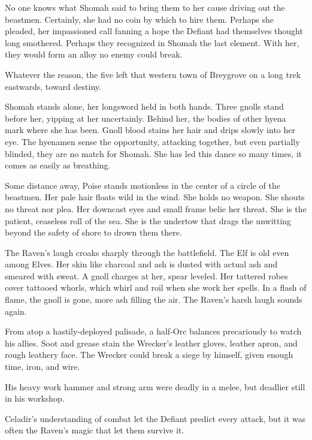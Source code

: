 No one knows what Shomah said to bring them to her cause driving out the beastmen.
Certainly, she had no coin by which to hire them.
Perhaps she pleaded, her impassioned call fanning a hope the Defiant had themselves
  thought long smothered.
Perhaps they recognized in Shomah the last element.
With her, they would form an alloy no enemy could break.

Whatever the reason, the five left that western town of Breygrove on a long trek eastwards, toward
destiny.

\hrulefill

Shomah stands alone, her longsword held in both hands.
Three gnolls stand before her, yipping at her uncertainly.
Behind her, the bodies of other hyena mark where she has been.
Gnoll blood stains her hair and drips slowly into her eye.
The hyenamen sense the opportunity, attacking together, but even partially blinded, they are no
  match for Shomah.
She has led this dance so many times, it comes as easily as breathing.

Some distance away, Poise stands motionless in the center of a circle of the beastmen.
Her pale hair floats wild in the wind.
She holds no weapon.
She shouts no threat nor plea.
Her downcast eyes and small frame belie her threat.
She is the patient, ceaseless roll of the sea.
She is the undertow that drags the unwitting beyond the safety of shore to drown them there.

The Raven's laugh croaks sharply through the battlefield.
The Elf is old even among Elves.
Her skin like charcoal and ash is dusted with actual ash and smeared with sweat.
A gnoll charges at her, spear leveled.
Her tattered robes cover tattooed whorls, which whirl and roil when she work her spells.
In a flash of flame, the gnoll is gone, more ash filling the air.
The Raven's harsh laugh sounds again.

From atop a hastily-deployed palisade, a half-Orc balances precariously to watch his allies.
Soot and grease stain the Wrecker's leather gloves, leather apron, and rough leathery face.
The Wrecker could break a siege by himself, given enough time, iron, and wire.

His heavy work hammer and strong arm were deadly in a melee, but deadlier still in his workshop.









Celadir's understanding of combat let the Defiant predict every attack,
but it was often the Raven's magic that let them survive it.


